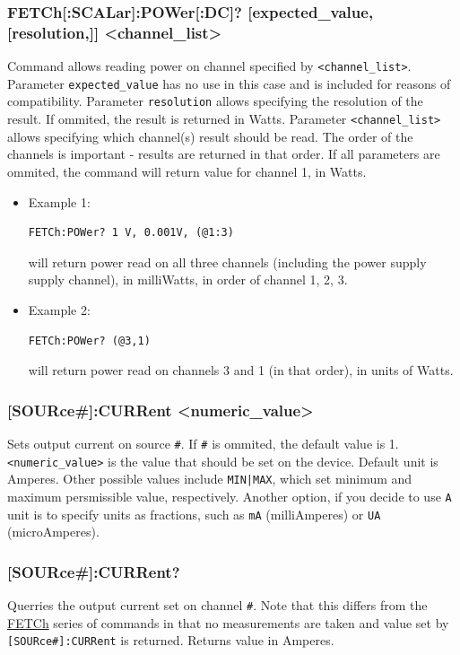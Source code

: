 \documentclass[a4paper,10pt]{article}
\begin{document}
		\subsubsection{FETCh[:SCALar]:POWer[:DC]? [expected\_value, [resolution,]] <channel\_list>}
		        Command allows reading power on channel specified by \verb|<channel_list>|. Parameter \verb|expected_value| has no use in this case and is included for reasons of compatibility. Parameter \verb|resolution| allows specifying the resolution of the result. If ommited, the result is returned in Watts. Parameter \verb|<channel_list>| allows specifying which channel(s) result should be read. The order of the channels is important - results are returned in that order.
		        \newline If all parameters are ommited, the command will return value for channel 1, in Watts.
		        \begin{itemize}
		            \item Example 1:
		                \begin{verbatim}FETCh:POWer? 1 V, 0.001V, (@1:3)\end{verbatim} will return power read on all three channels (including the power supply supply channel), in milliWatts, in order of channel 1, 2, 3.
		            \item Example 2:
		                \begin{verbatim}FETCh:POWer? (@3,1)\end{verbatim} will return power read on channels 3 and 1 (in that order), in units of Watts.
		        \end{itemize}
		\subsubsection{[SOURce\#]:CURRent <numeric\_value>}
		        Sets output current on source \verb|#|. If \verb|#| is ommited, the default value is 1.
		        \newline
		        \verb|<numeric_value>| is the value that should be set on the device. Default unit is Amperes. Other possible values include \verb!MIN|MAX!, which set minimum and maximum persmissible value, respectively. Another option, if you decide to use \verb|A| unit is to specify units as fractions, such as \verb|mA| (milliAmperes) or \verb|UA| (microAmperes). 
		\subsubsection{[SOURce\#]:CURRent?}
		        Querries the output current set on channel \verb|#|. Note that this differs from the \hyperlink{FETCh}{FETCh} series of commands in that no measurements are taken and value set by \verb|[SOURce#]:CURRent| is returned.
		        \newline
		        Returns value in Amperes.
\end{document}

